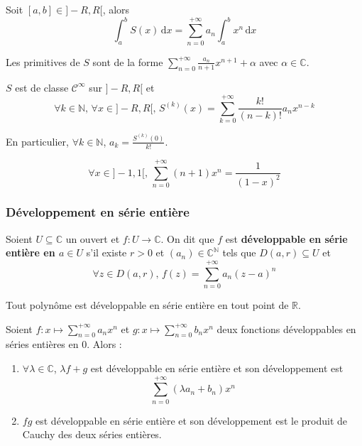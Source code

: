 	\begin{proposition}
		Soit $[a, b] \in ]-R, R[$, alors
		\[ \int_{a}^{b} S(x) \, \mathrm{d}x = \sum_{n=0}^{+\infty} a_n \int_{a}^{b} x^n \, \mathrm{d}x \]
	\end{proposition}

	\begin{corollary}
		Les primitives de $S$ sont de la forme $\sum_{n=0}^{+\infty} \frac{a_n}{n+1} x^{n+1} + \alpha$ avec $\alpha \in \mathbb{C}$.
	\end{corollary}

	\begin{proposition}
		$S$ est de classe $\mathcal{C}^\infty$ sur $]-R,R[$ et
		\[ \forall k \in \mathbb{N}, \, \forall x \in ]-R,R[, \, S^{(k)}(x) = \sum_{k = 0}^{+\infty} \frac{k!}{(n-k)!} a_n x^{n-k} \]
	\end{proposition}

	\begin{remark}
		En particulier, $\forall k \in \mathbb{N}$, $a_k = \frac{S^{(k)}(0)}{k!}$.
	\end{remark}

	\begin{example}
		\[ \forall x \in ]-1, 1[, \, \sum_{n=0}^{+\infty} (n+1)x^n = \frac{1}{(1-x)^2} \]
	\end{example}

	\subsubsection{Développement en série entière}


	\begin{definition}
		Soient $U \subseteq \mathbb{C}$ un ouvert et $f : U \rightarrow \mathbb{C}$. On dit que $f$ est \textbf{développable en série entière en $a \in U$} s'il existe $r > 0$ et $(a_n) \in \mathbb{C}^{\mathbb{N}}$ tels que $D(a, r) \subseteq U$ et
		\[ \forall z \in D(a, r), \, f(z) = \sum_{n=0}^{+\infty} a_n (z-a)^n \]
	\end{definition}


	\begin{example}
		Tout polynôme est développable en série entière en tout point de $\mathbb{R}$.
	\end{example}

	\begin{proposition}
		Soient $f : x \mapsto \sum_{n=0}^{+\infty} a_n x^n$ et $g : x \mapsto \sum_{n=0}^{+\infty} b_n x^n$ deux fonctions développables en séries entières en $0$. Alors :
		\begin{enumerate}[label=(\roman*)]
			\item $\forall \lambda \in \mathbb{C}$, $\lambda f + g$ est développable en série entière et son développement est
			\[ \sum_{n=0}^{+\infty} (\lambda a_n + b_n) x^n \]
			\item $fg$ est développable en série entière et son développement est le produit de Cauchy des deux séries entières.
		\end{enumerate}
	\end{proposition}

